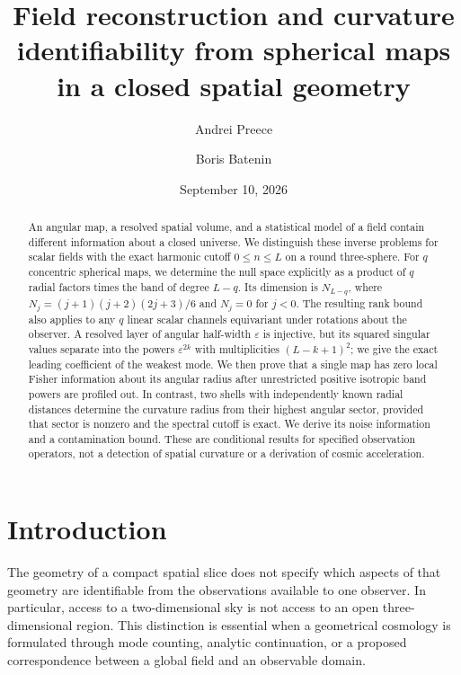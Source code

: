 \documentclass[aps,prd,reprint,amsmath,amssymb,nofootinbib,
longbibliography]{revtex4-2}
\newcommand{\ee}{\varepsilon}
\begin{document}
\title{Field reconstruction and curvature identifiability from spherical maps
in a closed spatial geometry}
\author{Andrei Preece}
\author{Boris Batenin}
\date{September 10, 2026}

\begin{abstract}
An angular map, a resolved spatial volume, and a statistical model of a field
contain different information about a closed universe. We distinguish these
inverse problems for scalar fields with the exact harmonic cutoff
$0\leq n\leq L$ on a round three-sphere. For $q$ concentric spherical maps,
we determine the null space explicitly as a product of $q$ radial factors
times the band of degree $L-q$. Its dimension is $N_{L-q}$, where
$N_j=(j+1)(j+2)(2j+3)/6$ and $N_j=0$ for $j<0$.
The resulting rank bound also applies to any $q$ linear scalar channels
equivariant under rotations about the observer. A resolved layer of angular
half-width $\ee$ is injective, but its squared singular values separate into
the powers $\ee^{2k}$ with multiplicities $(L-k+1)^2$; we give the exact
leading coefficient of the weakest mode. We then prove that a single map
has zero local Fisher information about its angular radius after unrestricted
positive isotropic band powers are profiled out. In contrast, two shells with
independently known radial distances determine the curvature radius from
their highest angular sector, provided that sector is nonzero and the
spectral cutoff is exact. We derive its noise information and a contamination
bound. These are conditional results for specified observation operators,
not a detection of spatial curvature or a derivation of cosmic acceleration.
\end{abstract}
\maketitle

\section{Introduction}
\label{sec:intro}

The geometry of a compact spatial slice does not specify which aspects of
that geometry are identifiable from the observations available to one
observer. In particular, access to a two-dimensional sky is not access to
an open three-dimensional region. This distinction is essential when a
geometrical cosmology is formulated through mode counting, analytic
continuation, or a proposed correspondence between a global field and an
observable domain.
\end{document}
